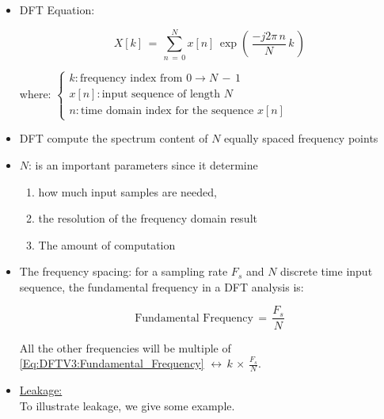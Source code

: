\begin{itemize}
    \item DFT Equation:
    
    
    \begin{equation}
        X[k] \, = \, \displaystyle\sum_{n \, = \, 0}^N x[n] \, \exp{\left(\, \displaystyle\frac{-j 2\pi \, n }{N} \, k \,\right)}
    \end{equation}
    
where: $\begin{cases}
k: \text{frequency index from } 0 \rightarrow N \, - \, 1 \\ 
x[n]: \text{input sequence of length }  N \\
n: \text{time domain index for the sequence } x[n]
\end{cases}$    
    
\item DFT compute the spectrum content of $N$ equally spaced frequency points    
    
\item $N$: is an important parameters since it determine 

\begin{enumerate}
    \item how much input samples are needed,
    
    \item  the resolution of the frequency domain result
    
    \item The amount of computation
\end{enumerate}
    
\item The frequency spacing: for a sampling rate $F_s$ and $N$ discrete time input sequence, the fundamental frequency in a DFT analysis is:

\begin{equation}
    \text{Fundamental Frequency} \, = \, \displaystyle\frac{F_s}{N}
    \label{Eq:DFTV3:Fundamental_Frequency}
\end{equation}

All the other frequencies will be multiple of \autoref{Eq:DFTV3:Fundamental_Frequency} $\leftrightarrow \, k \, \times \, \displaystyle\frac{F_s}{N}$.    
    
    
\newpage    
\item \underline{Leakage:}\\ 

To illustrate leakage, we give some example.


\end{itemize}
